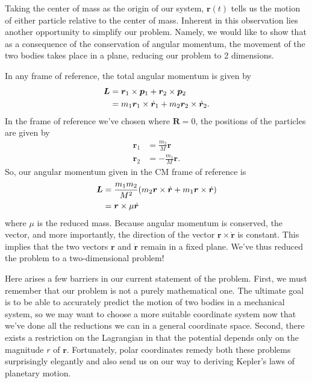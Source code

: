\documentclass[10pt, psamsfonts]{amsart}
\theoremstyle{definition}
\theoremstyle{remark}
\numberwithin{equation}{section}
\begin{document}
Taking the center of mass as the origin of our system, $\bm{r}(t)$ tells us the motion of either particle relative to the center of mass. Inherent in this observation lies another opportunity to simplify our problem. Namely, we would like to show that as a consequence of the conservation of angular momentum, the movement of the two bodies takes place in a plane, reducing our problem to 2 dimensions.

In any frame of reference, the total angular momentum is given by
\begin{align}
  \label{eq: Angular Momentum General Frame}
  \bm{L} & = \bm{r}_1 \times \bm{p}_1 + \bm{r}_2 \times \bm{p}_2 \notag \\
         & = m_1 \bm{r}_1 \times \dot{\bm{r}}_1 + m_2 \bm{r}_2 \times \dot{\bm{r}}_2.
\end{align}
In the frame of reference we've chosen where $\bm{R} = 0$, the positions of the particles are given by
\begin{align*}
  \bm{r}_1 &= \frac{m_2}{M} \bm{r}\\
  \bm{r}_2 &= -\frac{m_1}{M} \bm{r}.
\end{align*}
\noindent So, our angular momentum given in the CM frame of reference is
\begin{align}
  \label{eq:Angular Momentum CM Frame}
  \bm{L} &= \frac{m_1 m_2}{M^2} (m_2 \bm{r} \times \dot{\bm{r}} + m_1 \bm{r} \times \dot{\bm{r}}) \notag \\
         &= \bm{r} \times \mu \dot{\bm{r}}
\end{align}
where $\mu$ is the reduced mass. Because angular momentum is conserved, the vector, and more importantly, the direction of the vector $\bm{r} \times \dot{\bm{r}}$ is constant. This implies that the two vectors $\bm{r}$ and $\dot{\bm{r}}$ remain in a fixed plane. We've thus reduced the problem to a two-dimensional problem!

Here arises a few barriers in our current statement of the problem. First, we must remember that our problem is not a purely mathematical one. The ultimate goal is to be able to accurately predict the motion of two bodies in a mechanical system, so we may want to choose a more suitable coordinate system now that we've done all the reductions we can in a general coordinate space. Second, there exists a restriction on the Lagrangian in that the potential depends only on the magnitude $r$ of $\bm{r}$. Fortunately, polar coordinates remedy both these problems surprisingly elegantly and also send us on our way to deriving Kepler's laws of planetary motion.
\end{document}
